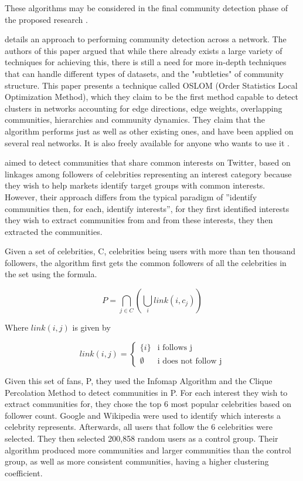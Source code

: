 These algorithms may be considered in the final community detection phase of the proposed research \cite{Tang:2010}.

 details an approach to performing community detection across a network. The authors of this paper argued that while there already exists a large variety of techniques for achieving this, there is still a need for more in-depth techniques that can handle different types of datasets, and the "subtleties" of community structure. This paper presents a technique called OSLOM (Order Statistics Local Optimization Method), which they claim to be the  first method capable to detect clusters in networks accounting for edge directions, edge weights, overlapping communities, hierarchies and community dynamics. They claim that the algorithm performs just as well as other existing ones, and have been applied on several real networks. It is also freely available for anyone who wants to use it \cite{Lancichinetti:2011}.

 aimed to detect communities that share common interests on Twitter, based on linkages among followers of celebrities representing an interest category because they wish to help markets identify target groups with common interests. However, their approach differs from the typical  paradigm of ''identify communities then, for each, identify interests'', for they first identified interests they wish to extract communities from and from these interests, they then extracted the communities. 

Given a set of celebrities, C, celebrities being users with more than ten thousand followers, the algorithm first gets the common followers of all the celebrities in the set using the formula. 

\begin{equation}
P = \bigcap_{j \in C} (\bigcup_i link(i,c_j))
\end{equation}

Where $link(i,j)$ is given by

\begin{equation}
link(i,j) = \begin{cases}
\{i\} & \text{i follows j} \\
\emptyset & \text{i does not follow j}
\end{cases}
\end{equation}

Given this set of fans, P, they used the Infomap Algorithm and the Clique Percolation Method to detect communities in P. For each interest they wish to extract communities for, they chose the top 6 most popular celebrities based on follower count. Google and Wikipedia were used to identify which interests a celebrity represents. Afterwards, all users that follow the 6 celebrities were selected. They then selected 200,858 random users as a control group. Their algorithm produced more communities and larger communities than the control group, as well as more consistent communities, having a higher clustering coefficient. 


